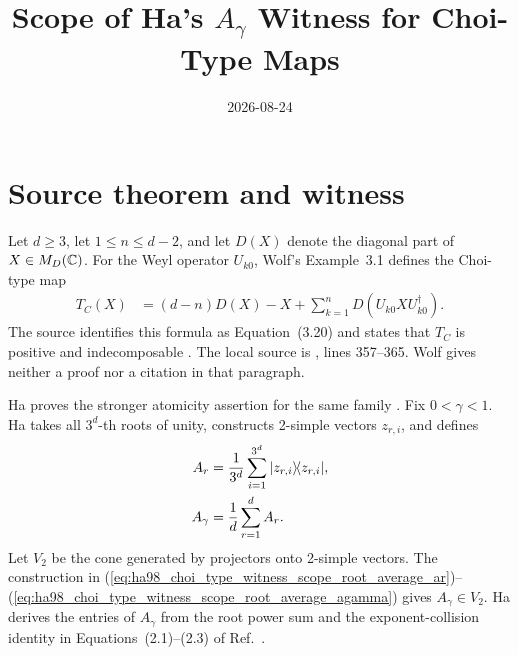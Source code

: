 \documentclass{article}
\title{Scope of Ha's $A_\gamma$ Witness for Choi-Type Maps}
\author{}
\date{2026-08-24}
\begin{document}
\maketitle
{}

\section{Source theorem and witness}

Let $d\geq3$, let $1\leq n\leq d-2$, and let $D(X)$ denote the diagonal
part of $X\in M_D(\mathbb{C})$. For the Weyl operator $U_{k0}$, Wolf's Example~3.1 defines
the Choi-type map
\begin{align}
    T_C(X)
        &=(d-n)D(X)-X
          +\sum_{k=1}^{n}D(U_{k0}XU_{k0}^{\dagger}).
    \label{eq:ha98_choi_type_witness_scope_choi_type_map}
\end{align}
The source identifies this formula as Equation~(3.20) and states that $T_C$ is
positive and indecomposable \cite[Example~3.1]{Wolf2012Quantum}. The local
source is
, lines
357--365. Wolf gives neither a proof nor a citation in that paragraph.

Ha proves the stronger atomicity assertion for the same family
\cite[Theorem~2.1, pp.~593--595]{Ha1998AtomicPositiveMaps}. Fix
$0<\gamma<1$. Ha takes all $3^d$-th roots of unity, constructs 2-simple
vectors $z_{r,i}$, and defines
\begin{align}
    A_r
        &=\frac{1}{3^d}\sum_{i=1}^{3^d}|z_{r,i}\rangle\!\langle z_{r,i}|,
    \label{eq:ha98_choi_type_witness_scope_root_average_ar}\\
    A_\gamma
        &=\frac{1}{d}\sum_{r=1}^{d}A_r.
    \label{eq:ha98_choi_type_witness_scope_root_average_agamma}
\end{align}
Let $V_2$ be the cone generated by projectors onto 2-simple vectors. The
construction in
(\ref{eq:ha98_choi_type_witness_scope_root_average_ar})--%
(\ref{eq:ha98_choi_type_witness_scope_root_average_agamma}) gives
$A_\gamma\in V_2$. Ha derives the entries of $A_\gamma$ from the root
power sum and the exponent-collision identity in Equations~(2.1)--(2.3) of
Ref.~\cite{Ha1998AtomicPositiveMaps}.
\end{document}
